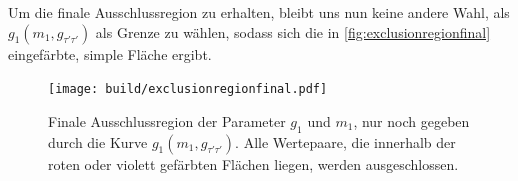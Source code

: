Um die finale Ausschlussregion zu erhalten, bleibt uns nun keine andere Wahl, als $g_1(m_1,g_{\tau'\tau'})$ als Grenze zu wählen, sodass sich die in \autoref{fig:exclusionregionfinal} eingefärbte, simple Fläche ergibt.

\begin{figure}[H]
    \centering
    \texttt{[image: build/exclusionregionfinal.pdf]}
    \caption{Finale Ausschlussregion der Parameter $g_1$ und $m_1$, nur noch gegeben durch die Kurve $g_1(m_1, g_{\tau'\tau'})$. Alle Wertepaare, die innerhalb der roten oder violett gefärbten Flächen liegen, werden ausgeschlossen.}
    \label{fig:exclusionregionfinal}
\end{figure}


